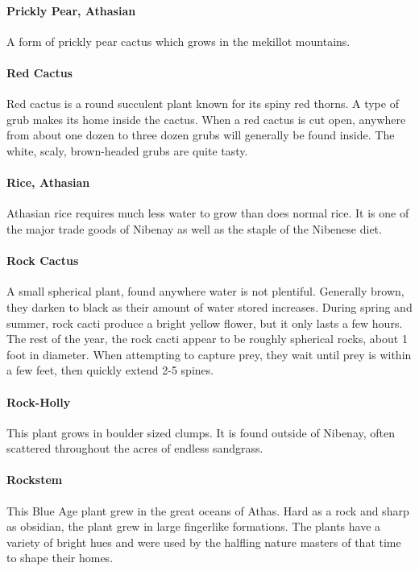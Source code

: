 \begin{multicols}{2}
\paragraph{Prickly Pear, Athasian}
A form of prickly pear cactus which grows in the mekillot mountains.

\paragraph{Red Cactus}
Red cactus is a round succulent plant known for its spiny red thorns. A
type of grub makes its home inside the cactus. When a red cactus is cut
open, anywhere from about one dozen to three dozen grubs will generally
be found inside. The white, scaly, brown-headed grubs are quite tasty.

\paragraph{Rice, Athasian}
Athasian rice requires much less water to grow than does normal rice. It
is one of the major trade goods of Nibenay as well as the staple of the
Nibenese diet.

\paragraph{Rock Cactus}
A small spherical plant, found anywhere water is not plentiful. Generally
brown, they darken to black as their amount of water stored increases.
During spring and summer, rock cacti produce a bright yellow flower, but
it only lasts a few hours. The rest of the year, the rock cacti appear
to be roughly spherical rocks, about 1 foot in diameter. When attempting
to capture prey, they wait until prey is within a few feet, then quickly
extend 2-5 spines.

\paragraph{Rock-Holly}
This plant grows in boulder sized clumps. It is found outside of Nibenay,
often scattered throughout the acres of endless sandgrass.

\paragraph{Rockstem}
This Blue Age plant grew in the great oceans of Athas. Hard as a rock and
sharp as obsidian, the plant grew in large fingerlike formations. The
plants have a variety of bright hues and were used by the halfling nature
masters of that time to shape their homes.


\end{multicols}
